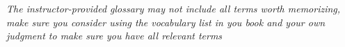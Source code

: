 \printglossary[style=treegroup, title=Key Terms, toctitle=Key Terms]

\textit{The instructor-provided glossary may not include all terms
  worth memorizing,
  make sure you consider using the vocabulary list in you book and your own
judgment to make sure you have all relevant terms}
